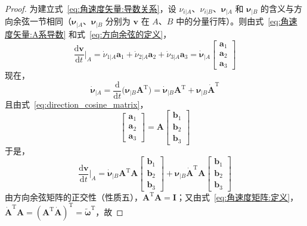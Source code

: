 \begin{proof}
为建立式~\eqref{eq:角速度矢量:导数关系}，设 $\nu_{i|A}$、$\nu_{i|B}$、$\bm{\nu}_{|A}$ 和 $\bm{\nu}_{|B}$ 的含义与方向余弦一节相同（$\bm{\nu}_{|A}$、$\bm{\nu}_{|B}$ 分别为 $\bm{v}$ 在 $A$、$B$ 中的分量行阵）。则由式~\eqref{eq:角速度矢量:A系导数} 和式~\eqref{eq:方向余弦的定义}，
\begin{equation}
    \frac{\mathrm{d}\bm{v}}{\mathrm{d}t}\Big|_A
    = \dot{\nu}_{1|A}\mathbf{a}_1 + \dot{\nu}_{2|A}\mathbf{a}_2 + \dot{\nu}_{3|A}\mathbf{a}_3
    = \dot{\bm{\nu}}_{|A}\begin{bmatrix}\mathbf{a}_1 \\ \mathbf{a}_2 \\ \mathbf{a}_3\end{bmatrix}
\end{equation}
现在，
\begin{equation}
    \dot{\bm{\nu}}_{|A} = \frac{\mathrm{d}}{\mathrm{d}t}\bigl(\bm{\nu}_{|B}\bm{A}^{\mathrm{T}}\bigr)
    = \dot{\bm{\nu}}_{|B}\bm{A}^{\mathrm{T}} + \bm{\nu}_{|B}\dot{\bm{A}}^{\mathrm{T}}
\end{equation}
且由式~\eqref{eq:direction_cosine_matrix}，
\begin{equation}
    \begin{bmatrix}\mathbf{a}_1 \\ \mathbf{a}_2 \\ \mathbf{a}_3\end{bmatrix}
    = \bm{A}\begin{bmatrix}\mathbf{b}_1 \\ \mathbf{b}_2 \\ \mathbf{b}_3\end{bmatrix}
\end{equation}
于是，
\begin{equation}
    \frac{\mathrm{d}\bm{v}}{\mathrm{d}t}\Big|_A
    = \dot{\bm{\nu}}_{|B}\bm{A}^{\mathrm{T}}\bm{A}\begin{bmatrix}\mathbf{b}_1 \\ \mathbf{b}_2 \\ \mathbf{b}_3\end{bmatrix}
    + \bm{\nu}_{|B}\dot{\bm{A}}^{\mathrm{T}}\bm{A}\begin{bmatrix}\mathbf{b}_1 \\ \mathbf{b}_2 \\ \mathbf{b}_3\end{bmatrix}
\end{equation}
由方向余弦矩阵的正交性（性质五），$\bm{A}^{\mathrm{T}}\bm{A}=\bm{I}$；又由式~\eqref{eq:角速度矩阵:定义}，$\dot{\bm{A}}^{\mathrm{T}}\bm{A}=(\bm{A}^{\mathrm{T}}\dot{\bm{A}})^{\mathrm{T}}=\bm{\tilde{\omega}}^{\mathrm{T}}$，故

\end{proof}
